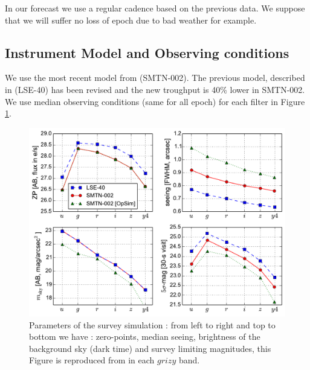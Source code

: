 \documentclass[\docopts]{\docclass}
\begin{document}
In our forecast we use a regular cadence based on the previous data. We suppose that we will suffer no loss of epoch due to bad weather for example.

\subsection{Instrument Model and Observing conditions}

We use the most recent model from \cite{SMTN-002} (SMTN-002). The previous model, described in \cite{LSE-40} (LSE-40) has been revised and the new troughput is 40\% lower  in SMTN-002.
We use median observing conditions (same for all epoch) for each filter in Figure \ref{fig:zp}.

\begin{figure}[t]
\begin{center}
\includegraphics[width=\linewidth]{lsst_model_summary.pdf}
\caption{Parameters of the survey simulation : from left to right and top to bottom we have : zero-points, median seeing, brightness of the background sky (dark time) and survey limiting magnitudes, this Figure is reproduced from \cite{SN-CADENCE} in each $grizy$ band.}
\label{fig:zp}
\end{center}
\end{figure}
\end{document}
